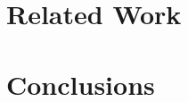 \documentclass[10pt,sigconf]{acmart}
\begin{document}



\section{}




\section{}





\section{Related Work}

%
%



\section{Conclusions}
\end{document}
